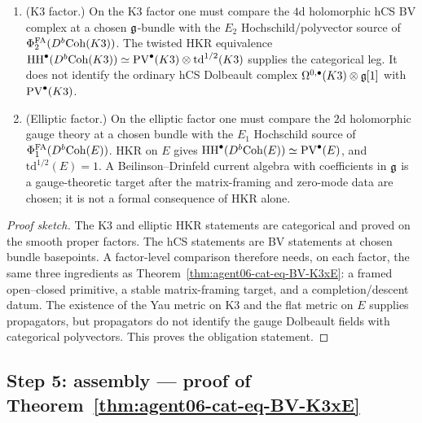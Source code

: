 \begin{proposition}
\label{prop:agent06-factor-level}
\begin{enumerate}[label=\textup{(\arabic*)}]
\item \textup{(K3 factor.)} On the K3 factor one must compare the
$4$d holomorphic hCS BV complex at a chosen $\mathfrak g$-bundle with the
$E_2$ Hochschild/polyvector source of $\Phi^{\mathrm{FA}}_2(D^b\mathrm{Coh}(K3))$. The
twisted HKR equivalence
$\mathrm{HH}^\bullet(D^b\mathrm{Coh}(K3)) \simeq \mathrm{PV}^\bullet(K3)\otimes
\mathrm{td}^{1/2}(K3)$ supplies the categorical leg. It does not
identify the ordinary hCS Dolbeault complex
$\Omega^{0,\bullet}(K3)\otimes\mathfrak g[1]$ with
$\mathrm{PV}^\bullet(K3)$.
\item \textup{(Elliptic factor.)} On the elliptic factor one must
compare the $2$d holomorphic gauge theory at a chosen bundle with the
$E_1$ Hochschild source of $\Phi^{\mathrm{FA}}_1(D^b\mathrm{Coh}(E))$. HKR on $E$ gives
$\mathrm{HH}^\bullet(D^b\mathrm{Coh}(E))\simeq\mathrm{PV}^\bullet(E)$, and
$\mathrm{td}^{1/2}(E)=1$. A Beilinson--Drinfeld current algebra with
coefficients in $\mathfrak g$ is a gauge-theoretic target after the
matrix-framing and zero-mode data are chosen; it is not a formal
consequence of HKR alone.
\end{enumerate}
\end{proposition}

\begin{proof}[Proof sketch]
The K3 and elliptic HKR statements are categorical and proved on the
smooth proper factors. The hCS statements are BV statements at chosen
bundle basepoints. A factor-level comparison therefore needs, on each
factor, the same three ingredients as Theorem~\ref{thm:agent06-cat-eq-BV-K3xE}:
a framed open--closed primitive, a stable matrix-framing target, and a
completion/descent datum. The existence of the Yau metric on K3 and the
flat metric on $E$ supplies propagators, but propagators do not identify
the gauge Dolbeault fields with categorical polyvectors. This proves
the obligation statement.
\end{proof}

\subsection*{Step 5: assembly --- proof of
Theorem~\ref{thm:agent06-cat-eq-BV-K3xE}}
\label{sec:agent06-step5-assembly}

